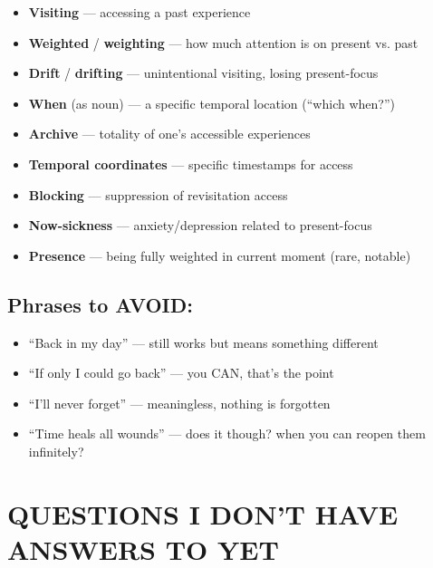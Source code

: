 \documentclass[11pt,letterpaper]{article}
\begin{document}
\begin{itemize}
    \item \textbf{Visiting} --- accessing a past experience
    \item \textbf{Weighted} / \textbf{weighting} --- how much attention is on present vs. past
    \item \textbf{Drift} / \textbf{drifting} --- unintentional visiting, losing present-focus
    \item \textbf{When} (as noun) --- a specific temporal location (``which when?'')
    \item \textbf{Archive} --- totality of one's accessible experiences
    \item \textbf{Temporal coordinates} --- specific timestamps for access
    \item \textbf{Blocking} --- suppression of revisitation access
    \item \textbf{Now-sickness} --- anxiety/depression related to present-focus
    \item \textbf{Presence} --- being fully weighted in current moment (rare, notable)
\end{itemize}

\subsection*{Phrases to AVOID:}

\begin{itemize}
    \item ``Back in my day'' --- still works but means something different
    \item ``If only I could go back'' --- you CAN, that's the point
    \item ``I'll never forget'' --- meaningless, nothing is forgotten
    \item ``Time heals all wounds'' --- does it though? when you can reopen them infinitely?
\end{itemize}

\vspace{1em}

\section*{QUESTIONS I DON'T HAVE ANSWERS TO YET}
\end{document}
